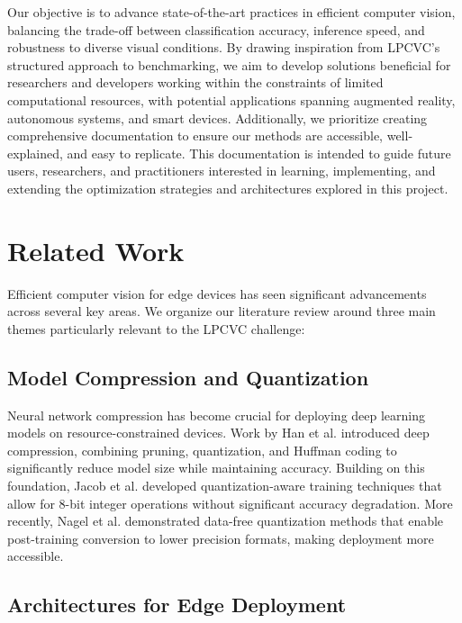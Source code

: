 \documentclass[11pt, oneside]{article}   	%
\begin{document}
Our objective is to advance state-of-the-art practices in efficient computer vision, balancing the trade-off between classification accuracy, inference speed, and robustness to diverse visual conditions. By drawing inspiration from LPCVC’s structured approach to benchmarking, we aim to develop solutions beneficial for researchers and developers working within the constraints of limited computational resources, with potential applications spanning augmented reality, autonomous systems, and smart devices. Additionally, we prioritize creating comprehensive documentation to ensure our methods are accessible, well-explained, and easy to replicate. This documentation is intended to guide future users, researchers, and practitioners interested in learning, implementing, and extending the optimization strategies and architectures explored in this project.



\section*{Related Work}

Efficient computer vision for edge devices has seen significant advancements across several key areas. We organize our literature review around three main themes particularly relevant to the LPCVC challenge:


\subsection*{Model Compression and Quantization}

Neural network compression has become crucial for deploying deep learning models on resource-constrained devices. Work by Han et al. \cite{han2016deepcompressioncompressingdeep} introduced deep compression, combining pruning, quantization, and Huffman coding to significantly reduce model size while maintaining accuracy. Building on this foundation, Jacob et al. \cite{jacob2017quantizationtrainingneuralnetworks} developed quantization-aware training techniques that allow for 8-bit integer operations without significant accuracy degradation. More recently, Nagel et al. \cite{nagel2021whitepaperneuralnetwork} demonstrated data-free quantization methods that enable post-training conversion to lower precision formats, making deployment more accessible.

\subsection*{Architectures for Edge Deployment}
\end{document}
